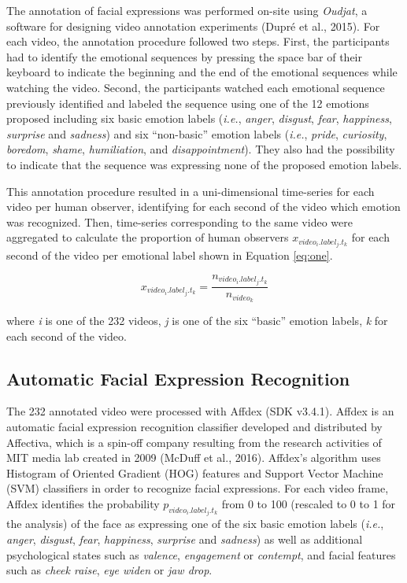 \documentclass[
  english,
  doc]{apa7}
\begin{document}
The annotation of facial expressions was performed on-site using \emph{Oudjat}, a software for designing video annotation experiments (Dupré et al., 2015). For each video, the annotation procedure followed two steps. First, the participants had to identify the emotional sequences by pressing the space bar of their keyboard to indicate the beginning and the end of the emotional sequences while watching the video. Second, the participants watched each emotional sequence previously identified and labeled the sequence using one of the 12 emotions proposed including six basic emotion labels (\emph{i.e.}, \emph{anger}, \emph{disgust}, \emph{fear}, \emph{happiness}, \emph{surprise} and \emph{sadness}) and six ``non-basic'' emotion labels (\emph{i.e.}, \emph{pride}, \emph{curiosity}, \emph{boredom}, \emph{shame}, \emph{humiliation}, and \emph{disappointment}). They also had the possibility to indicate that the sequence was expressing none of the proposed emotion labels.

This annotation procedure resulted in a uni-dimensional time-series for each video per human observer, identifying for each second of the video which emotion was recognized. Then, time-series corresponding to the same video were aggregated to calculate the proportion of human observers \(x_{video_{i}.label_{j}.t_{k}}\) for each second of the video per emotional label shown in Equation \eqref{eq:one}.

\begin{equation}
x_{video_{i}.label_{j}.t_{k}} = \frac{n_{video_{i}.label_{j}.t_{k}}}{n_{video_{k}}}\label{eq:one}
\end{equation}

where \emph{i} is one of the 232 videos, \emph{j} is one of the six ``basic'' emotion labels, \emph{k} for each second of the video.

\hypertarget{automatic-facial-expression-recognition}{%
\subsection{Automatic Facial Expression Recognition}\label{automatic-facial-expression-recognition}}

The 232 annotated video were processed with Affdex (SDK v3.4.1). Affdex is an automatic facial expression recognition classifier developed and distributed by Affectiva, which is a spin-off company resulting from the research activities of MIT media lab created in 2009 (McDuff et al., 2016). Affdex's algorithm uses Histogram of Oriented Gradient (HOG) features and Support Vector Machine (SVM) classifiers in order to recognize facial expressions. For each video frame, Affdex identifies the probability \(p_{video_{i}.label_{j}.t_{k}}\) from 0 to 100 (rescaled to 0 to 1 for the analysis) of the face as expressing one of the six basic emotion labels (\emph{i.e.}, \emph{anger}, \emph{disgust}, \emph{fear}, \emph{happiness}, \emph{surprise} and \emph{sadness}) as well as additional psychological states such as \emph{valence}, \emph{engagement} or \emph{contempt}, and facial features such as \emph{cheek raise}, \emph{eye widen} or \emph{jaw drop}.
\end{document}
